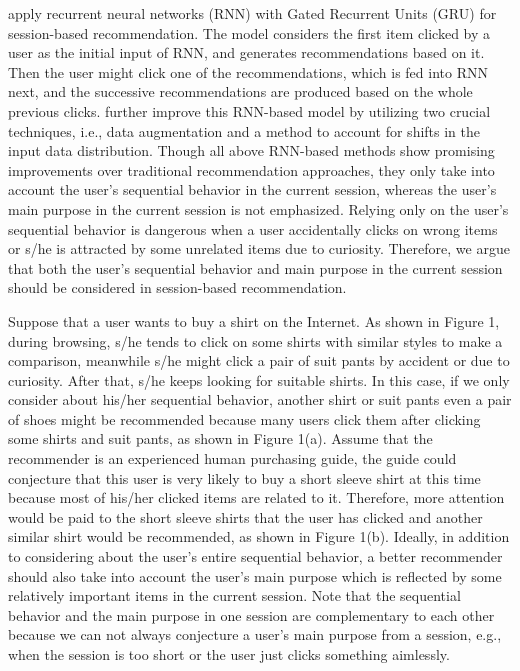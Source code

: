 \documentclass[sigconf]{acmart}
\begin{document}
\citet{hidasi2015session} apply recurrent neural networks (RNN) with Gated Recurrent Units (GRU) for session-based recommendation. The model considers the first item clicked by a user as the initial input of RNN, and generates recommendations based on it. Then the user might click one of the recommendations, which is fed into RNN next, and the successive recommendations are produced based on the whole previous clicks. \citet{tan2016improved} further improve this RNN-based model by utilizing two crucial techniques, i.e., data augmentation and a method to account for shifts in the input data distribution. Though all above RNN-based methods show promising improvements over traditional recommendation approaches, they only take into account the user's sequential behavior in the current session, whereas the user's main purpose in the current session is not emphasized. Relying only on the user's sequential behavior is dangerous when a user accidentally clicks on wrong items or s/he is attracted by some unrelated items due to curiosity. Therefore, we argue that both the user's sequential behavior and main purpose in the current session should be considered in session-based recommendation.

Suppose that a user wants to buy a shirt on the Internet. As shown in Figure 1, during browsing, s/he tends to click on some shirts with similar styles to make a comparison, meanwhile s/he might click a pair of suit pants by accident or due to curiosity. After that, s/he keeps looking for suitable shirts. In this case, if we only consider about his/her sequential behavior, another shirt or suit pants even a pair of shoes might be recommended because many users click them after clicking some shirts and suit pants, as shown in Figure 1(a). Assume that the recommender is an experienced human purchasing guide, the guide could conjecture that this user is very likely to buy a short sleeve shirt at this time because most of his/her clicked items are related to it. Therefore, more attention would be paid to the short sleeve shirts that the user has clicked and another similar shirt would be recommended, as shown in Figure 1(b). Ideally, in addition to considering about the user's entire sequential behavior, a better recommender should also take into account the user's main purpose which is reflected by some relatively important items in the current session. Note that the sequential behavior and the main purpose in one session are complementary to each other because we can not always conjecture a user's main purpose from a session, e.g., when the session is too short or the user just clicks something aimlessly.
\end{document}
